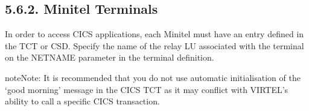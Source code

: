 \documentclass[letterpaper,10pt,english]{sphinxmanual}
\begin{document}


\subsection{5.6.2. Minitel Terminals}
\label{\detokenize{Installation_Guide:minitel-terminals}}
In order to access CICS applications, each Minitel must have an entry defined in the TCT or CSD. Specify the name of the relay LU associated with the terminal on the NETNAME parameter in the terminal definition.

\begin{sphinxVerbatim}[commandchars=\\\{\}]
       
                         
                  
                
\end{sphinxVerbatim}


\begin{sphinxadmonition}{note}{Note:}
It is recommended that you do not use automatic initialisation of the ‘good morning’ message in the CICS TCT as it may conflict with VIRTEL’s ability to call a specific CICS transaction.
\end{sphinxadmonition}
\end{document}
